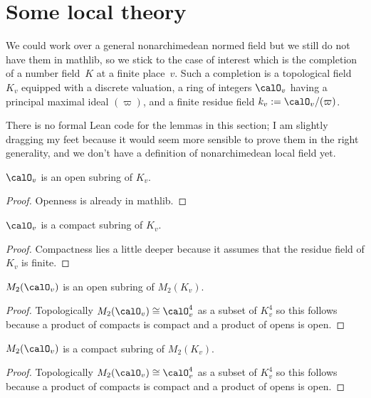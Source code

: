 \section{Some local theory}

We could work over a general nonarchimedean normed field but we still do not have them
in mathlib, so we stick to the case of interest which is the completion of a number
field~$K$ at a finite place~$v$. Such a completion is a topological field~$K_v$
equipped with a discrete valuation, a ring of integers $\calO_v$ having a principal
maximal ideal $(\varpi)$, and a finite residue field $k_v:=\calO_v/(\varpi)$.

There is no formal Lean code for the lemmas in this section; I am slightly dragging my
feet because it would seem more sensible to prove them in the right generality,
and we don't have a definition of nonarchimedean local field yet.

\begin{lemma}
  \label{NumberField.isOpenAdicCompletionIntegers}
  \leanok
  $\calO_v$ is an open subring of $K_v$.
\end{lemma}
\begin{proof}
  \leanok
  Openness is already in mathlib.
\end{proof}

\begin{lemma}
  \label{NumberField.instCompactSpaceAdicCompletionIntegers}
  \leanok
  $\calO_v$ is a compact subring of $K_v$.
\end{lemma}
\begin{proof}
  \leanok
  Compactness lies a little deeper because it
  assumes that the residue field of $K_v$ is finite.
\end{proof}

\begin{lemma} $M_2(\calO_v)$ is an open subring of $M_2(K_v)$.
  \label{M2.localFullLevel.isOpen}
  \leanok
\end{lemma}
\begin{proof}
  \leanok
  Topologically $M_2(\calO_v)\cong \calO_v^4$ as a subset of $K_v^4$ so this
  follows because a product of compacts is compact and a product of opens is open.
\end{proof}

\begin{lemma} $M_2(\calO_v)$ is a compact subring of $M_2(K_v)$.
  \label{M2.localFullLevel.isCompact}
  \leanok
\end{lemma}
\begin{proof}
  \leanok
  Topologically $M_2(\calO_v)\cong \calO_v^4$ as a subset of $K_v^4$ so this
  follows because a product of compacts is compact and a product of opens is open.
\end{proof}


